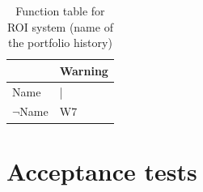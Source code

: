 \documentclass[runningheads,12pt]{article}
\begin{document}
\begin{table}[H]
{
\centering

\begin{tabular}{|l||l|}
\hline
 & Warning\\ 

\hline
Name  & |\\ 

\hline
$\lnot$Name & W7 \\ 

\hline
\end{tabular}

\caption{Function table for ROI system (name of the portfolio history)}
\label{table:ftable_name}
}
\end{table}




\section{Acceptance tests}
\end{document}
